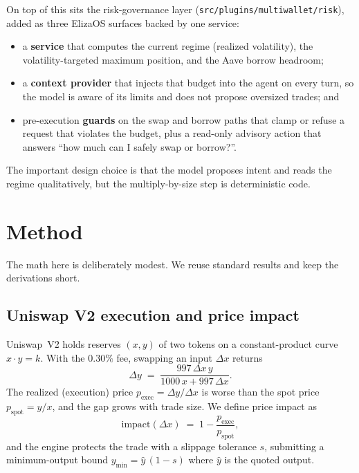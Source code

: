 \documentclass[11pt]{article}
\newcommand{\code}[1]{\texttt{#1}}
\begin{document}
On top of this sits the risk-governance layer (\code{src/plugins/multiwallet/risk}), added as three
ElizaOS surfaces backed by one service:
\begin{itemize}
  \item a \textbf{service} that computes the current regime (realized volatility), the
        volatility-targeted maximum position, and the Aave borrow headroom;
  \item a \textbf{context provider} that injects that budget into the agent on every turn, so the
        model is aware of its limits and does not propose oversized trades; and
  \item pre-execution \textbf{guards} on the swap and borrow paths that clamp or refuse a request
        that violates the budget, plus a read-only advisory action that answers ``how much can I
        safely swap or borrow?''.
\end{itemize}
The important design choice is that the model proposes intent and reads the regime qualitatively, but
the multiply-by-size step is deterministic code.

\section{Method}\label{sec:method}
The math here is deliberately modest. We reuse standard results and keep the derivations short.

\subsection{Uniswap V2 execution and price impact}
Uniswap~V2 holds reserves $(x, y)$ of two tokens on a constant-product curve $x \cdot y = k$. With the
$0.30\%$ fee, swapping an input $\Delta x$ returns
\begin{equation}
\Delta y \;=\; \frac{997\,\Delta x\, y}{1000\,x + 997\,\Delta x}.
\end{equation}
The realized (execution) price $p_{\text{exec}} = \Delta y / \Delta x$ is worse than the spot price
$p_{\text{spot}} = y/x$, and the gap grows with trade size. We define price impact as
\begin{equation}
\text{impact}(\Delta x) \;=\; 1 - \frac{p_{\text{exec}}}{p_{\text{spot}}},
\end{equation}
and the engine protects the trade with a slippage tolerance $s$, submitting a minimum-output bound
$y_{\min} = \hat{y}\,(1-s)$ where $\hat{y}$ is the quoted output.
\end{document}

